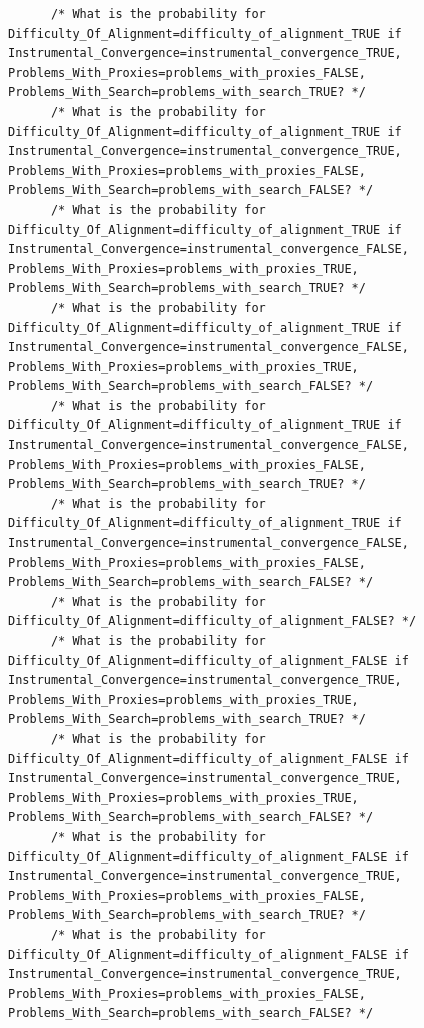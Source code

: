 \documentclass[
  11pt,
  letterpaper,
]{book}
\begin{document}
\begin{verbatim}
      /* What is the probability for Difficulty_Of_Alignment=difficulty_of_alignment_TRUE if Instrumental_Convergence=instrumental_convergence_TRUE, Problems_With_Proxies=problems_with_proxies_FALSE, Problems_With_Search=problems_with_search_TRUE? */
      /* What is the probability for Difficulty_Of_Alignment=difficulty_of_alignment_TRUE if Instrumental_Convergence=instrumental_convergence_TRUE, Problems_With_Proxies=problems_with_proxies_FALSE, Problems_With_Search=problems_with_search_FALSE? */
      /* What is the probability for Difficulty_Of_Alignment=difficulty_of_alignment_TRUE if Instrumental_Convergence=instrumental_convergence_FALSE, Problems_With_Proxies=problems_with_proxies_TRUE, Problems_With_Search=problems_with_search_TRUE? */
      /* What is the probability for Difficulty_Of_Alignment=difficulty_of_alignment_TRUE if Instrumental_Convergence=instrumental_convergence_FALSE, Problems_With_Proxies=problems_with_proxies_TRUE, Problems_With_Search=problems_with_search_FALSE? */
      /* What is the probability for Difficulty_Of_Alignment=difficulty_of_alignment_TRUE if Instrumental_Convergence=instrumental_convergence_FALSE, Problems_With_Proxies=problems_with_proxies_FALSE, Problems_With_Search=problems_with_search_TRUE? */
      /* What is the probability for Difficulty_Of_Alignment=difficulty_of_alignment_TRUE if Instrumental_Convergence=instrumental_convergence_FALSE, Problems_With_Proxies=problems_with_proxies_FALSE, Problems_With_Search=problems_with_search_FALSE? */
      /* What is the probability for Difficulty_Of_Alignment=difficulty_of_alignment_FALSE? */
      /* What is the probability for Difficulty_Of_Alignment=difficulty_of_alignment_FALSE if Instrumental_Convergence=instrumental_convergence_TRUE, Problems_With_Proxies=problems_with_proxies_TRUE, Problems_With_Search=problems_with_search_TRUE? */
      /* What is the probability for Difficulty_Of_Alignment=difficulty_of_alignment_FALSE if Instrumental_Convergence=instrumental_convergence_TRUE, Problems_With_Proxies=problems_with_proxies_TRUE, Problems_With_Search=problems_with_search_FALSE? */
      /* What is the probability for Difficulty_Of_Alignment=difficulty_of_alignment_FALSE if Instrumental_Convergence=instrumental_convergence_TRUE, Problems_With_Proxies=problems_with_proxies_FALSE, Problems_With_Search=problems_with_search_TRUE? */
      /* What is the probability for Difficulty_Of_Alignment=difficulty_of_alignment_FALSE if Instrumental_Convergence=instrumental_convergence_TRUE, Problems_With_Proxies=problems_with_proxies_FALSE, Problems_With_Search=problems_with_search_FALSE? */

\end{verbatim}
\end{document}

